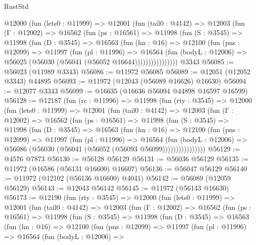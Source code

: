 \begin{lexlean}{RustStd}
\begin{coremodule}
        @12000
          (fun (lets0 : @11999) =>
          @12001
            (fun (tail0 : @4142) =>
            @12003
              (fun (Γ : @12002) =>
              @16562
                (fun (ps : @16561) =>
                @11998
                  (fun (S : @3545) =>
                  @11998
                    (fun (D : @3545) =>
                    @16563
                      (fun (hn : @16) =>
                      @12100
                        (fun (pns : @12099) =>
                        @11997
                          (fun (pl : @11996) =>
                          @16564
                            (fun (bodyL : @12006) =>
                            @56025 (@56030 (@56041 (@56052 @16644))))))))))))))))
    @3343
@56085 := @56023 (@11989 @3343)
@56086 := @11972 @56085
@56089 := @12051 (@12052 @3343) @44895
@56093 := @11972 (@12043 (@56089 @16626) @16630)
@56094 := @12077 @3343
@56099 := @16635 (@16636 @56094 @44898 @16597 @16599)
@56128 := @12187
    (fun (rc : @11996) =>
    @11998
      (fun (rty : @3545) =>
      @12000
        (fun (lets0 : @11999) =>
        @12001
          (fun (tail0 : @4142) =>
          @12003
            (fun (Γ : @12002) =>
            @16562
              (fun (ps : @16561) =>
              @11998
                (fun (S : @3545) =>
                @11998
                  (fun (D : @3545) =>
                  @16563
                    (fun (hn : @16) =>
                    @12100
                      (fun (pns : @12099) =>
                      @11997
                        (fun (pl : @11996) =>
                        @16564
                          (fun (bodyL : @12006) =>
                          @56086 (@56030 (@56041 (@56052 (@56093 @56099))))))))))))))))
@56129 := @4576 @7873
@56130 := @56128 @56129
@56131 := @56036 @56129
@56135 := @11972 (@16586 (@56131 @16600) @16607)
@56136 := @56047 @56129
@56140 := @11972 (@12102 (@56136 @16600) @4041)
@56142 := @56089 (@12059 @56129)
@56143 := @12043 @56142
@56145 := @11972 (@56143 @16630)
@56173 := @12190
    (fun (rty : @3545) =>
    @12000
      (fun (lets0 : @11999) =>
      @12001
        (fun (tail0 : @4142) =>
        @12003
          (fun (Γ : @12002) =>
          @16562
            (fun (ps : @16561) =>
            @11998
              (fun (S : @3545) =>
              @11998
                (fun (D : @3545) =>
                @16563
                  (fun (hn : @16) =>
                  @12100
                    (fun (pns : @12099) =>
                    @11997
                      (fun (pl : @11996) =>
                      @16564
                        (fun (bodyL : @12006) =>

\end{coremodule}
\end{lexlean}
